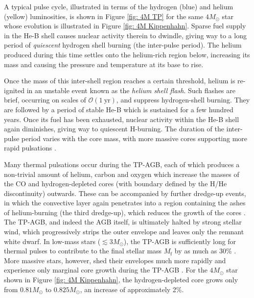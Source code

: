 A typical pulse cycle, illustrated in terms of the hydrogen (blue) and helium (yellow) luminosities, is shown in Figure \ref{fig: 4M TP} for the same $4M_{\odot}$ star whose evolution is illustrated in Figure \ref{fig: 4M Kippenhahn}. Sparse fuel supply in the He-B shell causes nuclear activity therein to dwindle, giving way to a long period of \textit{quiescent} hydrogen shell burning (the inter-pulse period). The helium produced during this time settles onto the helium-rich region below, increasing its mass and causing the pressure and temperature at its base to rise. 

Once the mass of this inter-shell region reaches a certain threshold, helium is re-ignited in an unstable event known as the \textit{helium shell flash}. Such flashes are brief, occurring on scales of $\mathcal{O}(1\ \mathrm{yr})$, and suppress hydrogen-shell burning. They are followed by a period of stable He-B which is sustained for a few hundred years. Once its fuel has been exhausted, nuclear activity within the He-B shell again diminishes, giving way to quiescent H-burning. The duration of the inter-pulse period varies with the core mass, with more massive cores supporting more rapid pulsations \cite{Paczynski-IP-MC-reln, Boothroyd-core-IP-reln}.



Many thermal pulsations occur during the TP-AGB, each of which produces a non-trivial amount of helium, carbon and oxygen which increase the masses of the CO and hydrogen-depleted cores (with boundary defined by the H/He discontinuity) outwards. These can be accompanied by further dredge-up events, in which the convective layer again penetrates into a region containing the ashes of helium-burning (the third dredge-up), which reduces the growth of the cores \cite{2004ApJ...605..425H}. The TP-AGB, and indeed the AGB itself, is ultimately halted by strong stellar wind, which progressively strips the outer envelope and leaves only the remnant white dwarf. In low-mass stars ($\lesssim3M_{\odot}$), the TP-AGB is sufficiently long for thermal pulses to contribute to the final stellar mass $M_{\mathrm{f}}$ by as much as 30\% \cite{Cummings_2019}. More massive stars, however, shed their envelopes much more rapidly and experience only marginal core growth during the TP-AGB \cite{10.1093/mnras/stt1034}. For the $4M_{\odot}$ star shown in Figure \ref{fig: 4M Kippenhahn}, the hydrogen-depleted core grows only from $0.81M_{\odot}$ to $0.825M_{\odot}$, an increase of approximately 2\%. 


